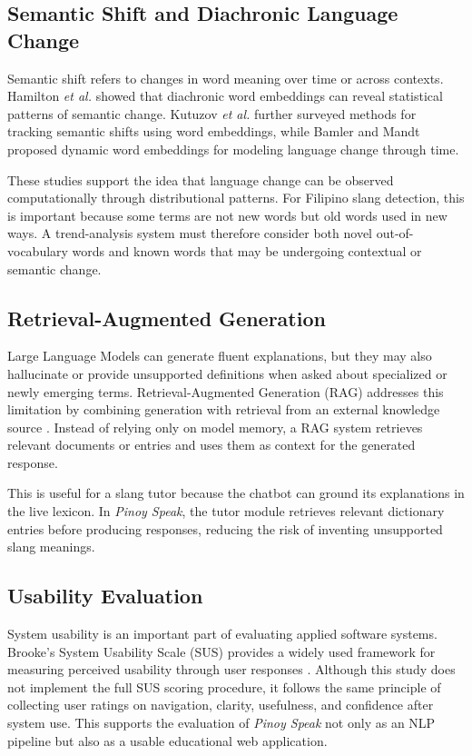 \subsection{Semantic Shift and Diachronic Language Change}
Semantic shift refers to changes in word meaning over time or across contexts. Hamilton \textit{et al.} \cite{b7} showed that diachronic word embeddings can reveal statistical patterns of semantic change. Kutuzov \textit{et al.} \cite{b8} further surveyed methods for tracking semantic shifts using word embeddings, while Bamler and Mandt \cite{b9} proposed dynamic word embeddings for modeling language change through time.

These studies support the idea that language change can be observed computationally through distributional patterns. For Filipino slang detection, this is important because some terms are not new words but old words used in new ways. A trend-analysis system must therefore consider both novel out-of-vocabulary words and known words that may be undergoing contextual or semantic change.

\subsection{Retrieval-Augmented Generation}
Large Language Models can generate fluent explanations, but they may also hallucinate or provide unsupported definitions when asked about specialized or newly emerging terms. Retrieval-Augmented Generation (RAG) addresses this limitation by combining generation with retrieval from an external knowledge source \cite{b10}. Instead of relying only on model memory, a RAG system retrieves relevant documents or entries and uses them as context for the generated response.

This is useful for a slang tutor because the chatbot can ground its explanations in the live lexicon. In \textit{Pinoy Speak}, the tutor module retrieves relevant dictionary entries before producing responses, reducing the risk of inventing unsupported slang meanings.

\subsection{Usability Evaluation}
System usability is an important part of evaluating applied software systems. Brooke's System Usability Scale (SUS) provides a widely used framework for measuring perceived usability through user responses \cite{b11}. Although this study does not implement the full SUS scoring procedure, it follows the same principle of collecting user ratings on navigation, clarity, usefulness, and confidence after system use. This supports the evaluation of \textit{Pinoy Speak} not only as an NLP pipeline but also as a usable educational web application.